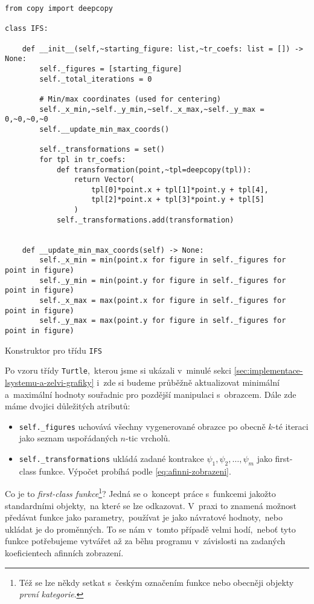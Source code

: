\begin{program}[h]
\begin{lstlisting}[style=python]
from copy import deepcopy

class IFS:

    def __init__(self,~starting_figure: list,~tr_coefs: list = []) -> None:
        self._figures = [starting_figure]
        self._total_iterations = 0

        # Min/max coordinates (used for centering)
        self._x_min,~self._y_min,~self._x_max,~self._y_max = 0,~0,~0,~0
        self.__update_min_max_coords()

        self._transformations = set()
        for tpl in tr_coefs:
            def transformation(point,~tpl=deepcopy(tpl)):
                return Vector(
                    tpl[0]*point.x + tpl[1]*point.y + tpl[4],
                    tpl[2]*point.x + tpl[3]*point.y + tpl[5]
                )
            self._transformations.add(transformation)
    
    
    def __update_min_max_coords(self) -> None:
        self._x_min = min(point.x for figure in self._figures for point in figure)
        self._y_min = min(point.y for figure in self._figures for point in figure)
        self._x_max = max(point.x for figure in self._figures for point in figure)
        self._y_max = max(point.y for figure in self._figures for point in figure)
\end{lstlisting}
    \caption{Konstruktor pro třídu \texttt{IFS}}
    \label{prog:konstruktor-ifs}
\end{program}
Po vzoru třídy \texttt{Turtle},~kterou jsme si ukázali v~minulé sekci \ref{sec:implementace-lsystemu-a-zelvi-grafiky} i~zde si budeme průběžně aktualizovat minimální a~maximální hodnoty souřadnic pro pozdější manipulaci s~obrazcem. Dále zde máme dvojici důležitých atributů:
\begin{itemize}
    \item \texttt{self.\_figures} uchovává všechny vygenerované obrazce po obecně $k$-té iteraci jako seznam uspořádaných $n$-tic vrcholů.
    \item \texttt{self.\_transformations} ukládá zadané kontrakce $\psi_1,\psi_2,\ldots,\psi_m$ jako first-class funkce. Výpočet probíhá podle \eqref{eq:afinni-zobrazeni}.
\end{itemize}
Co je to \emph{first-class funkce}\footnote{Též se lze někdy setkat s~českým označením funkce nebo obecněji objekty \emph{první kategorie}.}? Jedná se o~koncept práce s~funkcemi jakožto standardními objekty,~na které se lze odkazovat. V~praxi to znamená možnost předávat funkce jako parametry,~používat je jako návratové hodnoty,~nebo ukládat je do proměnných. To se nám v~tomto případě velmi hodí,~neboť tyto funkce potřebujeme vytvářet až za běhu programu v~závislosti na zadaných koeficientech afinních zobrazení.

